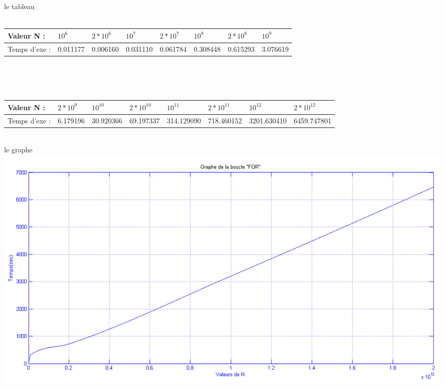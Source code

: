\documentclass[•]{article}
\begin{document}
le tableau
\\
\\
\color{blue}
\begin{tabular}{ |p{2cm}||p{1.6cm}|p{1.6cm}|p{1.6cm}|p{1.6cm}|p{1.6cm}|p{1.6cm}|p{1.6cm}| }
 \hline
 Valeur N : & $10^6$& $2*10^6$& $10^7$& $2*10^7$& $10^8$& $2*10^8$& $10^9$ \\
 \hline
 Temps d'exe : & 0.011177 & 0.006160 & 0.031110 & 0.061784 & 0.308448 & 0.615293 &  3.076619 \\
 \hline
\end{tabular}
\\
\\
\\
\begin{tabular}{ |p{2cm}||p{1.6cm}|p{1.6cm}|p{1.6cm}|p{1.6cm}|p{1.6cm}|p{1.6cm}|p{1.6cm}| }
 \hline
 Valeur N : & $2*10^9$& $10^{10}$& $2*10^{10}$& $10^{11}$& $2*10^{11}$& $10^{12}$& $2*10^{12}$ \\
 \hline
 Temps d'exe : &  6.179196 & 30.920366 & 69.197337 & 314.129090 &718.460152 &3201.630410 & 6459.747801   \\
 \hline
\end{tabular}
\color{black}


\textrm{  }
\\

le graphe 
\textrm{  }
\\
\includegraphics[width=1\textwidth]{graphe/for.png}
\end{document}
